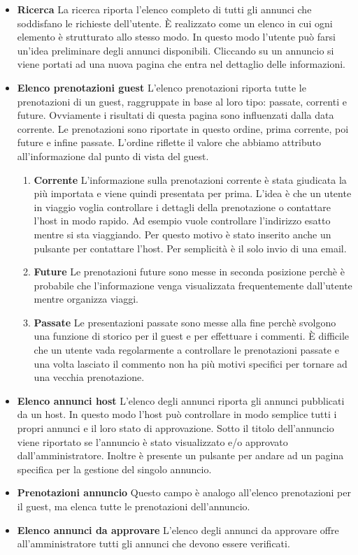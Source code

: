\documentclass[1_relazione.tex]{subfiles}
\begin{document}
\begin{itemize}
\item \textbf{Ricerca}
La ricerca riporta l'elenco completo di tutti gli annunci che soddisfano le richieste dell'utente. \`{E} realizzato come un elenco in cui ogni elemento \`{e} strutturato allo stesso modo. In questo modo l'utente pu\`{o} farsi un'idea preliminare degli annunci disponibili. Cliccando su un annuncio si viene portati ad una nuova pagina che entra nel dettaglio delle informazioni.

\item\textbf{Elenco prenotazioni guest}
L'elenco prenotazioni riporta tutte le prenotazioni di un guest, raggruppate in base al loro tipo: passate, correnti e future. Ovviamente i risultati di questa pagina sono influenzati dalla data corrente. Le prenotazioni sono riportate in questo ordine, prima corrente, poi future e infine passate. L'ordine riflette il valore che abbiamo attributo all'informazione dal punto di vista del guest.
\begin{enumerate}
\item \textbf{Corrente} L'informazione sulla prenotazioni corrente \`{e} stata giudicata la pi\`{u} importata e viene quindi presentata per prima. L'idea \`{e} che un utente in viaggio voglia controllare i dettagli della prenotazione o contattare l'host in modo rapido. Ad esempio vuole controllare l'indirizzo esatto mentre si sta viaggiando. Per questo motivo \`{e} stato inserito anche un pulsante per contattare l'host. Per semplicit\`{a} \`{e} il solo invio di una email.
\item \textbf{Future} Le prenotazioni future sono messe in seconda posizione perch\`{e} \`{e} probabile che l'informazione venga visualizzata frequentemente dall'utente mentre organizza viaggi.
\item \textbf{Passate} Le presentazioni passate sono messe alla fine perch\`{e} svolgono una funzione di storico per il guest e  per effettuare i commenti. \`{E} difficile che un utente vada regolarmente a controllare le prenotazioni passate e una volta lasciato il commento non ha pi\`{u} motivi specifici per tornare ad una vecchia prenotazione.
\end{enumerate}

\item \textbf{Elenco annunci host}
L'elenco degli annunci riporta gli annunci pubblicati da un host. In questo modo l'host pu\`{o} controllare in modo semplice tutti i propri annunci e il loro stato di approvazione. Sotto il titolo dell'annuncio viene riportato se l'annuncio \`{e} stato visualizzato e/o approvato dall'amministratore. Inoltre \`{e} presente un pulsante per andare ad un pagina specifica per la gestione del singolo annuncio.

\item \textbf{Prenotazioni annuncio} Questo campo \`{e} analogo all'elenco prenotazioni per il guest, ma elenca tutte le prenotazioni dell'annuncio.

\item \textbf{Elenco annunci da approvare}
L'elenco degli annunci da approvare offre all'amministratore tutti gli annunci che devono essere verificati. 

\end{itemize}
\end{document}
